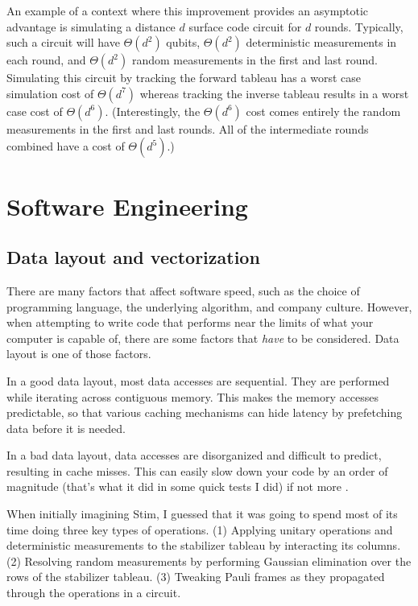 \documentclass[onecolumn,unpublished]{quantumarticle}
\theoremstyle{definition}
\theoremstyle{definition}
\theoremstyle{definition}
\begin{document}
An example of a context where this improvement provides an asymptotic advantage is simulating a distance $d$ surface code circuit for $d$ rounds.
Typically, such a circuit will have $\Theta(d^2)$ qubits, $\Theta(d^2)$ deterministic measurements in each round, and $\Theta(d^2)$ random measurements in the first and last round.
Simulating this circuit by tracking the forward tableau has a worst case simulation cost of $\Theta(d^7)$ whereas tracking the inverse tableau results in a worst case cost of $\Theta(d^6)$.
(Interestingly, the $\Theta(d^6)$ cost comes entirely the random measurements in the first and last rounds.
All of the intermediate rounds combined have a cost of $\Theta(d^5)$.)

\section{Software Engineering}
\label{sec:engineering}

\subsection{Data layout and vectorization}

There are many factors that affect software speed, such as the choice of programming language, the underlying algorithm, and company culture.
However, when attempting to write code that performs near the limits of what your computer is capable of, there are some factors that {\em have} to be considered.
Data layout is one of those factors.

In a good data layout, most data accesses are sequential.
They are performed while iterating across contiguous memory.
This makes the memory accesses predictable, so that various caching mechanisms can hide latency by prefetching data before it is needed.

In a bad data layout, data accesses are disorganized and difficult to predict, resulting in cache misses.
This can easily slow down your code by an order of magnitude (that's what it did in some quick tests I did) if not more \cite{norviglatency}.

When initially imagining Stim, I guessed that it was going to spend most of its time doing three key types of operations.
(1) Applying unitary operations and deterministic measurements to the stabilizer tableau by interacting its columns.
(2) Resolving random measurements by performing Gaussian elimination over the rows of the stabilizer tableau.
(3) Tweaking Pauli frames as they propagated through the operations in a circuit.
\end{document}
